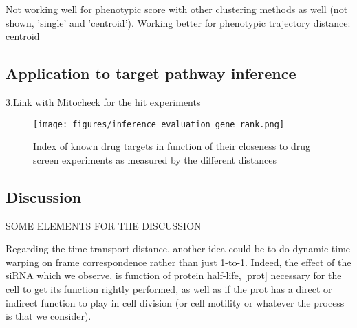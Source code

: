 Not working well for phenotypic score with other clustering methods as well (not shown, 'single' and 'centroid'). Working better for phenotypic trajectory distance: centroid
\subsection{Application to target pathway inference}
3.Link with Mitocheck for the hit experiments


\begin{figure*}[ht!]
\centerline{\texttt{[image: figures/inference\_evaluation\_gene\_rank.png]}
}
\caption{Index of known drug targets in function of their closeness to drug screen experiments as measured by the different distances}
\label{gene_rank}
\end{figure*}




\subsection{Discussion}
SOME ELEMENTS FOR THE DISCUSSION

Regarding the time transport distance, another idea could be to do dynamic time warping on frame correspondence rather than just 1-to-1. Indeed, the effect of the siRNA which we observe, is function of protein half-life, [prot] necessary for the cell to get its function rightly performed, as well as  if the prot has a direct or indirect function to play in cell division (or cell motility or whatever the process is that we consider).

